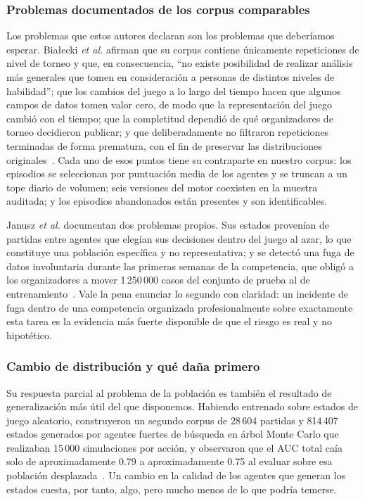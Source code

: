 \documentclass[conference]{IEEEtran}
\begin{document}
\subsubsection{Problemas documentados de los corpus comparables}
Los problemas que estos autores declaran son los problemas que deber\'iamos
esperar. Bia\l ecki \textit{et al.} afirman que su corpus contiene
\'unicamente repeticiones de nivel de torneo y que, en consecuencia, ``no
existe posibilidad de realizar an\'alisis m\'as generales que tomen en
consideraci\'on a personas de distintos niveles de habilidad''; que los
cambios del juego a lo largo del tiempo hacen que algunos campos de datos
tomen valor cero, de modo que la representaci\'on del juego cambi\'o con el
tiempo; que la completitud dependi\'o de qu\'e organizadores de torneo
decidieron publicar; y que deliberadamente no filtraron repeticiones
terminadas de forma prematura, con el fin de preservar las distribuciones
originales~\cite{bialecki_sc2egset_2023}. Cada uno de esos puntos tiene su
contraparte en nuestro corpus: los episodios se seleccionan por puntuaci\'on
media de los agentes y se truncan a un tope diario de volumen; seis
versiones del motor coexisten en la muestra auditada; y los episodios
abandonados est\'an presentes y son identificables.

Janusz \textit{et al.} documentan dos problemas propios. Sus estados
proven\'ian de partidas entre agentes que eleg\'ian sus decisiones dentro del
juego al azar, lo que constituye una poblaci\'on espec\'ifica y no
representativa; y se detect\'o una fuga de datos involuntaria durante las
primeras semanas de la competencia, que oblig\'o a los organizadores a
mover 1\,250\,000 casos del conjunto de prueba al de
entrenamiento~\cite{janusz_hearthstone_2017}. Vale la pena enunciar lo
segundo con claridad: un incidente de fuga dentro de una competencia
organizada profesionalmente sobre exactamente esta tarea es la evidencia
m\'as fuerte disponible de que el riesgo es real y no hipot\'etico.

\subsubsection{Cambio de distribuci\'on y qu\'e da\~na primero}
Su respuesta parcial al problema de la poblaci\'on es tambi\'en el resultado
de generalizaci\'on m\'as \'util del que disponemos. Habiendo entrenado
sobre estados de juego aleatorio, construyeron un segundo corpus de 28\,604
partidas y 814\,407 estados generados por agentes fuertes de b\'usqueda en
\'arbol Monte Carlo que realizaban 15\,000 simulaciones por acci\'on, y
observaron que el AUC total ca\'ia solo de aproximadamente 0.79 a
aproximadamente 0.75 al evaluar sobre esa poblaci\'on
desplazada~\cite{janusz_hearthstone_2017}. Un cambio en la calidad de los
agentes que generan los estados cuesta, por tanto, algo, pero mucho menos de
lo que podr\'ia temerse.
\end{document}
